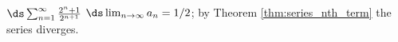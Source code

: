{$\ds \sum_{n=1}^\infty \frac{2^n+1}{2^{n+1}}$
}
{$\ds \lim_{n\to\infty}a_n = 1/2$; by Theorem \ref{thm:series_nth_term} the series diverges.
}